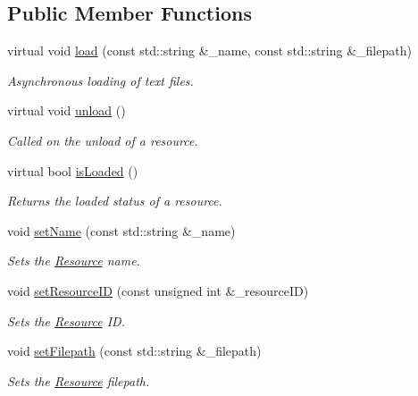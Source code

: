 \subsection*{Public Member Functions}
\begin{DoxyCompactItemize}
\item 
virtual void \hyperlink{class_cookie_eng_1_1_resources_1_1_resource_a75648b8f2e442bebc90d6eb4ea3a2f6e}{load} (const std\+::string \&\+\_\+name, const std\+::string \&\+\_\+filepath)
\begin{DoxyCompactList}\small\item\em Asynchronous loading of text files. \end{DoxyCompactList}\item 
virtual void \hyperlink{class_cookie_eng_1_1_resources_1_1_resource_acfe5141c546d7f3f3e08435b3a21b09c}{unload} ()
\begin{DoxyCompactList}\small\item\em Called on the unload of a resource. \end{DoxyCompactList}\item 
virtual bool \hyperlink{class_cookie_eng_1_1_resources_1_1_resource_a79d4a9f266373ca5b77d8debca83ee7f}{is\+Loaded} ()
\begin{DoxyCompactList}\small\item\em Returns the loaded status of a resource. \end{DoxyCompactList}\item 
void \hyperlink{class_cookie_eng_1_1_resources_1_1_resource_a3968130b5e2207df4735a616c6545158}{set\+Name} (const std\+::string \&\+\_\+name)
\begin{DoxyCompactList}\small\item\em Sets the \hyperlink{class_cookie_eng_1_1_resources_1_1_resource}{Resource} name. \end{DoxyCompactList}\item 
void \hyperlink{class_cookie_eng_1_1_resources_1_1_resource_ae7f9a2883f18b3a9d2e4e470c83bb704}{set\+Resource\+ID} (const unsigned int \&\+\_\+resource\+ID)
\begin{DoxyCompactList}\small\item\em Sets the \hyperlink{class_cookie_eng_1_1_resources_1_1_resource}{Resource} ID. \end{DoxyCompactList}\item 
void \hyperlink{class_cookie_eng_1_1_resources_1_1_resource_a9ad88ddeec633dbb1df1b6f1f8ff4c47}{set\+Filepath} (const std\+::string \&\+\_\+filepath)
\begin{DoxyCompactList}\small\item\em Sets the \hyperlink{class_cookie_eng_1_1_resources_1_1_resource}{Resource} filepath. \end{DoxyCompactList}\end{DoxyCompactItemize}
